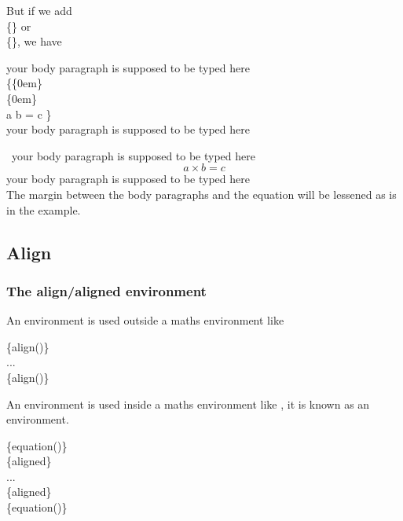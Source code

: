 \begin{frame}
	But if we add \\
	\{\} or\\
	\{\}, we have
    \begin{example}
		your body paragraph is supposed to be typed here\\
		\{\{0em\}\\
		\{0em\}\\
		a  b = c \}\\
		your body paragraph is supposed to be typed here\\
	\end{example}
	\ your body paragraph is supposed to be typed here
	{\setlength\abovedisplayskip{0em}
    \setlength\belowdisplayskip{0em}
    \begin{equation}a \times b =c \end{equation}}
    your body paragraph is supposed to be typed here\\[0.5em]
    The margin between the body paragraphs and the equation will be lessened as is in the example.
\end{frame}

\subsection{Align}

\begin{frame}
	\frametitle{The align/aligned environment}
	An  environment is used outside a maths environment like 
	\begin{command}
		\{align(\structure{*})\}\\
		\qquad ...\\
		\{align(\structure{*})\}\\
	\end{command}
	An  environment is used inside a maths environment like , it is known as an  environment.
	\begin{command}
		\{equation(\structure{*})\}\\
		\qquad{}\{aligned\}\\
		\qquad\qquad ...\\
		\qquad{}\{aligned\}\\
		\{equation(\structure{*})\}\\
	\end{command}
\end{frame}

